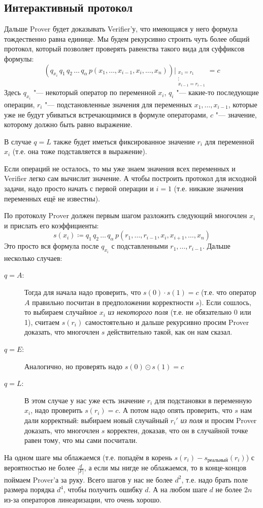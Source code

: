 \subsection{Интерактивный протокол}
	Дальше Prover будет доказывать Verifier'у, что имеющаяся у него формула тождественно равна единице.
	Мы будем рекурсивно строить чуть более общий протокол, который позволяет проверять равенства такого вида для суффиксов формулы:
	\[
		\left( q_{x_i} \, q_1 \, q_2 \, \dots \, q_{\alpha}\, p(x_1, \dots, x_{i-1}, x_{i}, \dots, x_n) \right)|_{\substack{x_1=r_1\\ \vdots\\ x_{i-1}=r_{i-1}}} = c
	\]
	Здесь $q_{x_i}$ "--- некоторый оператор по переменной $x_i$, $q_i$ "--- какие-то последующие операции, $r_i$ "--- подстановленные значения для переменных $x_1, \dots, x_{i-1}$,
	которые уже не будут убиваться встречающимися в формуле операторами, $c$ "--- значение, которому должно быть равно выражение.
	\begin{Rem}
		В случае $q=L$ также будет иметься фиксированное значение $r_i$ для переменной $x_i$ (т.е. она тоже подставляется в выражение).
	\end{Rem}

	Если операций не осталось, то мы уже знаем значения всех переменных и Verifier легко сам вычислит значение.
	А чтобы построить протокол для исходной задачи, надо просто начать с первой операции и $i=1$ (т.е. никакие значения переменных ещё не известны).

	По протоколу Prover должен первым шагом разложить следующий многочлен $x_i$ и прислать его коэффициенты:
	\[
		s(x_i) \coloneq q_1\, q_2\,\dots\,q_{\alpha}\, p(r_1, \dots, r_{i-1}, x_i, x_{i+1}, \dots, x_n)
	\]
	Это просто вся формула после $q_{x_i}$ с подставленными $r_1, \dots, r_{i-1}$.
	Дальше несколько случаев:
	\begin{description}
		\item[$q=A$:]
			Тогда для начала надо проверить, что $s(0) \cdot s(1) = c$ (т.е. что оператор $A$ правильно посчитан в предположении корректности $s$).
			Если сошлось, то выбираем случайное $x_i$ \textit{из некоторого поля} (т.е. не обязательно 0 или 1), считаем $s(r_i)$ самостоятельно
			и дальше рекурсивно просим Prover доказать, что многочлен $s$ действительно такой, как он нам сказал.
		\item[$q=E$:]
			Аналогично, но проверять надо $s(0) \odot s(1) = c$
		\item[$q=L$:]
			В этом случае у нас уже есть значение $r_i$ для подстановки в переменную $x_i$, надо проверить $s(r_i)=c$.
			А потом надо опять проверить, что $s$ нам дали корректный: выбираем новый случайный $r_i'$ \textit{из поля} и просим Prover
			доказать, что многочлен $s$ корректен, доказав, что он в случайной точке равен тому, что мы сами посчитали.
	\end{description}
	На одном шаге мы облажаемся (т.е. попадём в корень $s(r_i)-s_{\text{реальный}}(r_i)$) с вероятностью не более $\frac{d}{|F|}$, а если мы нигде не облажаемся, то
	в конце-концов поймаем Prover'а за руку.
	Всего шагов у нас не более $d^2$, т.е. надо брать поле размера порядка $d^4$, чтобы получить ошибку $d$.
	А на любом шаге $d$ не более $2n$ из-за операторов линеаризации, что очень хорошо.
